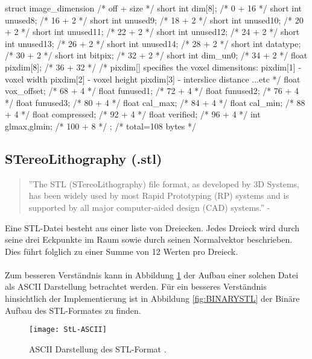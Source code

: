 \begin{program}
	\caption{Image Dimension als C-Struktur \cite{AnalyzeFormat}}
	\label{prog:imageDim}
	\begin{CCode}
struct image_dimension
{ /* off + size */
	short int dim[8]; /* 0 + 16 */
	short int unused8; /* 16 + 2 */
	short int unused9; /* 18 + 2 */
	short int unused10; /* 20 + 2 */
	short int unused11; /* 22 + 2 */
	short int unused12; /* 24 + 2 */
	short int unused13; /* 26 + 2 */
	short int unused14; /* 28 + 2 */
	short int datatype; /* 30 + 2 */
	short int bitpix; /* 32 + 2 */
	short int dim_un0; /* 34 + 2 */
	float pixdim[8]; /* 36 + 32 */
	/*
	pixdim[] specifies the voxel dimensitons:
	pixdim[1] - voxel width
	pixdim[2] - voxel height
	pixdim[3] - interslice distance
	...etc
	*/
	float vox_offset; /* 68 + 4 */
	float funused1; /* 72 + 4 */
	float funused2; /* 76 + 4 */
	float funused3; /* 80 + 4 */
	float cal_max; /* 84 + 4 */
	float cal_min; /* 88 + 4 */
	float compressed; /* 92 + 4 */
	float verified; /* 96 + 4 */
	int glmax,glmin; /* 100 + 8 */
}; /* total=108 bytes */ 
	\end{CCode}
\end{program}

\subsection{STereoLithography (.stl)}
\begin{quote}
	''The STL (STereoLithography) file format, as developed by 3D Systems, has been widely used by most Rapid Prototyping (RP) systems and is supported by all major computer-aided design (CAD) systems.'' - \cite{STereoLithography}
\end{quote}
Eine STL-Datei besteht aus einer liste von Dreiecken. Jedes Dreieck wird durch seine drei Eckpunkte im Raum sowie durch seinen Normalvektor beschrieben. Dies führt folglich zu einer Summe von 12 Werten pro Dreieck.\\
\\
Zum besseren Verständnis kann in Abbildung \ref{fig:ASCIISTL} der Aufbau einer solchen Datei als ASCII Darstellung betrachtet werden. Für ein besseres Verständnis hinsichtlich der Implementierung ist in Abbildung \ref{fig:BINARYSTL} der Binäre Aufbau des STL-Formates zu finden. 

\begin{figure}
	\centering
	\texttt{[image: StL-ASCII]}
	\caption{ASCII Darstellung des STL-Format \cite{STLFormat}.}
	\label{fig:ASCIISTL}
\end{figure}

